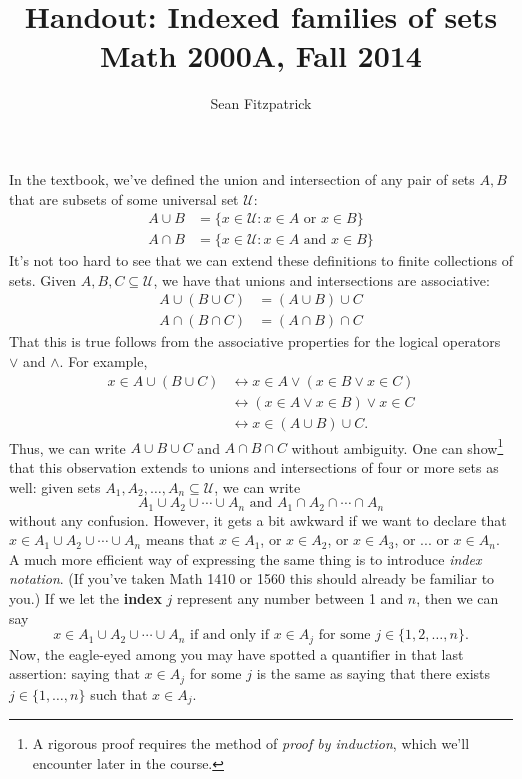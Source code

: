 \documentclass[letterpaper,12pt]{article}
\title{Handout: Indexed families of sets\\Math 2000A, Fall 2014}
\author{Sean Fitzpatrick}
\newcommand{\U}{\mathcal{U}}
\begin{document}
\maketitle

In the textbook, we've defined the union and intersection of any pair of sets $A,B$ that are subsets of some universal set $\U$:
\begin{align*}
 A\cup B & = \{x\in \U : x\in A \text{ or } x\in B\}\\
 A\cap B & = \{x\in \U : x\in A \text{ and } x\in B\}
\end{align*}
It's not too hard to see that we can extend these definitions to finite collections of sets. Given $A,B,C\subseteq \U$, we have that unions and intersections are associative:
\begin{align*}
 A\cup(B\cup C) & = (A\cup B)\cup C\\
 A\cap(B\cap C) & = (A\cap B)\cap C
\end{align*}
That this is true follows from the associative properties for the logical operators $\vee$ and $\wedge$. For example,
\begin{align*}
 x\in A\cup (B\cup C) & \leftrightarrow x\in A \vee (x\in B\vee x\in C)\\
&\leftrightarrow (x\in A\vee x\in B)\vee x\in C\\
&\leftrightarrow x\in (A\cup B)\cup C.
\end{align*}
Thus, we can write $A\cup B\cup C$ and $A\cap B\cap C$ without ambiguity. One can show\footnote{A rigorous proof requires the method of {\em proof by induction}, which we'll encounter later in the course.} that this observation extends to unions and intersections of four or more sets as well: given sets $A_1,A_2,\ldots, A_n\subseteq \U$, we can write
\[
 A_1\cup A_2\cup \cdots \cup A_n \text{ and } A_1\cap A_2\cap \cdots \cap A_n
\]
without any confusion. However, it gets a bit awkward if we want to declare that $x\in A_1\cup A_2\cup\cdots \cup A_n$ means that $x\in A_1$, or $x\in A_2$, or $x\in A_3$, or ... or $x\in A_n$. A much more efficient way of expressing the same thing is to introduce {\em index notation}. (If you've taken Math 1410 or 1560 this should already be familiar to you.) If we let the {\bf index} $j$ represent any number between 1 and $n$, then we can say
\[
 x\in A_1\cup A_2\cup\cdots\cup A_n \text{ if and only if } x\in A_j \text{ for some } j\in\{1,2,\ldots, n\}.
\]
Now, the eagle-eyed among you may have spotted a quantifier in that last assertion: saying that $x\in A_j$ for some $j$ is the same as saying that there exists $j\in\{1,\ldots, n\}$ such that $x\in A_j$.
\end{document}
